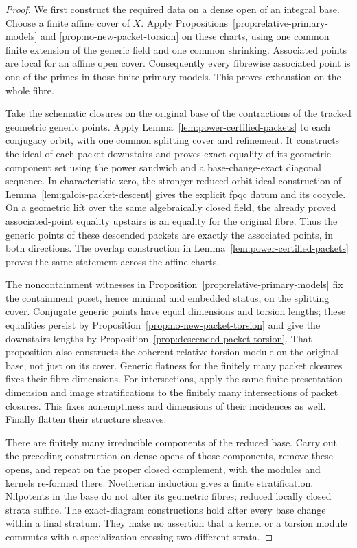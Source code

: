 \begin{proof}
We first construct the required data on a dense open of an integral
base.  Choose a finite affine cover of \(X\).  Apply
Propositions~\ref{prop:relative-primary-models} and
\ref{prop:no-new-packet-torsion} on these charts, using one common
finite extension of the generic field and one common shrinking.
Associated points are local for an affine open cover.  Consequently
every fibrewise associated point is one of the primes in those finite
primary models.  This proves exhaustion on the whole fibre.

Take the schematic closures on the original base of the contractions
of the tracked geometric generic points.  Apply
Lemma~\ref{lem:power-certified-packets} to each conjugacy orbit, with
one common splitting cover and refinement.  It constructs the ideal
of each packet downstairs and proves exact equality of its geometric
component set using the power sandwich and a base-change-exact
diagonal sequence.  In characteristic zero, the stronger reduced
orbit-ideal construction of Lemma~\ref{lem:galois-packet-descent}
gives the explicit fpqc datum and its cocycle.  On a geometric lift
over the same algebraically closed field, the already proved
associated-point equality upstairs is an equality for the original
fibre.  Thus the generic points of these descended packets are
exactly the associated points, in both directions.  The overlap
construction in Lemma~\ref{lem:power-certified-packets} proves the
same statement across the affine charts.

The noncontainment witnesses in
Proposition~\ref{prop:relative-primary-models} fix the containment
poset, hence minimal and embedded status, on the splitting cover.
Conjugate generic points have equal dimensions and torsion lengths;
these equalities persist by Proposition~\ref{prop:no-new-packet-torsion}
and give the downstairs lengths by
Proposition~\ref{prop:descended-packet-torsion}.  That proposition
also constructs the coherent relative torsion module on the original
base, not just on its cover.  Generic flatness for the finitely many
packet closures fixes their fibre dimensions.  For intersections,
apply the same finite-presentation dimension and image stratifications
to the finitely many intersections of packet closures.  This fixes
nonemptiness and dimensions of their incidences as well.  Finally
flatten their structure sheaves.

There are finitely many irreducible components of the reduced base.
Carry out the preceding construction on dense opens of those
components, remove these opens, and repeat on the proper closed
complement, with the modules and kernels re-formed there.  Noetherian
induction gives a finite stratification.  Nilpotents in the base do
not alter its geometric fibres; reduced locally closed strata suffice.
The exact-diagram constructions hold after every base change within
a final stratum.  They make no assertion that a kernel or a torsion
module commutes with a specialization crossing two different strata.
\end{proof}

